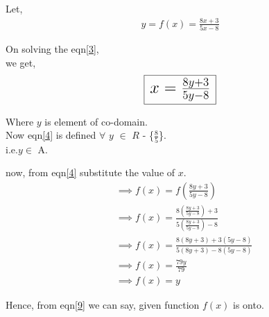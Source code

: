 \documentclass[journal,12pt,twocolumn]{IEEEtran}
\begin{document}
\vspace{5mm}
\vspace{5mm}

\noindent Let,
\begin{align} \label{3}
y = f(x) = \frac{8x+3}{5x-8}
\end{align}

On solving the eqn\eqref{3},\\ we get,
\begin{align} \label{4}
\LARGE\framebox[1.2\width]{$x$ = $\frac{8y+3}{5y-8}$}
\end{align}

Where $y$ is element of co-domain.\\ Now eqn\eqref{4} is defined $\forall$ $y$ $\in$ $R$ - \{$\frac{8}{5}$\}.\\ i.e.$y \in$ A.
\vspace{5mm}

\noindent now, from eqn\eqref{4} substitute the value of $x$.
\begin{align}
&\implies f(x) = f(\frac{8y+3}{5y-8}) \\
&\implies f(x) = \frac{8(\frac{8y+3}{5y-8})+3}{5(\frac{8y+3}{5y-8})-8} \\
&\implies f(x) = \frac{8(8y+3)+3(5y-8)}{5(8y+3)-8(5y-8)}\\
&\implies f(x)=\frac{79y}{79} \\
&\implies f(x) = y \label{9}
\end{align}

\noindent Hence, from eqn\eqref{9} we can say, given function $f(x)$ is onto.
\vspace{5mm}

\vspace{5mm}
\end{document}
